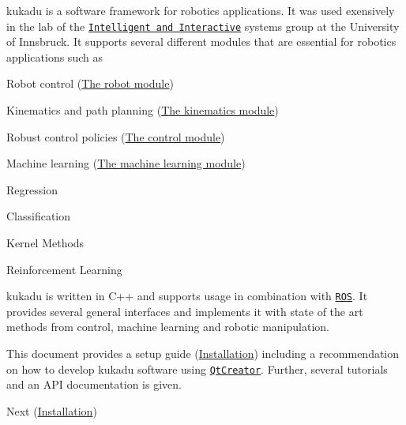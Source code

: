 kukadu is a software framework for robotics applications. It was used exensively in the lab of the \href{http://iis.uibk.ac.at}{\tt Intelligent and Interactive} systems group at the University of Innsbruck. It supports several different modules that are essential for robotics applications such as
\begin{DoxyItemize}
\item Robot control (\hyperlink{robotpage}{The robot module})
\item Kinematics and path planning (\hyperlink{kinematicspage}{The kinematics module})
\item Robust control policies (\hyperlink{controlpage}{The control module})
\item Machine learning (\hyperlink{mlpage}{The machine learning module})
\begin{DoxyItemize}
\item Regression
\item Classification
\item Kernel Methods
\item Reinforcement Learning
\end{DoxyItemize}
\end{DoxyItemize}

kukadu is written in C++ and supports usage in combination with \href{http://www.ros.org/}{\tt R\+OS}. It provides several general interfaces and implements it with state of the art methods from control, machine learning and robotic manipulation.

This document provides a setup guide (\hyperlink{installationpage}{Installation}) including a recommendation on how to develop kukadu software using \href{https://www.qt.io/ide/}{\tt Qt\+Creator}. Further, several tutorials and an A\+PI documentation is given.

Next (\hyperlink{installationpage}{Installation}) 